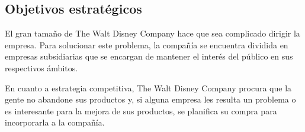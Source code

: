 \subsection{Objetivos estratégicos}
El gran tamaño de The Walt Disney Company hace que sea complicado dirigir la empresa. Para solucionar este problema, la compañía se encuentra dividida en empresas subsidiarias que se encargan de mantener el interés del público en sus respectivos ámbitos.

En cuanto a estrategia competitiva, The Walt Disney Company procura que la gente no abandone sus productos y, si alguna empresa les resulta un problema o es interesante para la mejora de sus productos, se planifica su compra para incorporarla a la compañía.